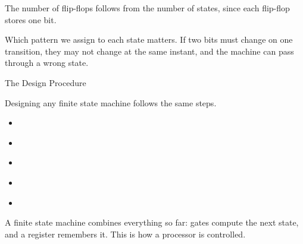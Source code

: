 \documentclass[mathserif, handout]{beamer}
\begin{document}
\begin{frame}
  The number of flip-flops follows from the number of states, since each flip-flop stores one bit.\\[4mm]
  \begin{center}
  \end{center}
  \vspace{2mm}
  \begin{center}
  \end{center}
\end{frame}

\begin{frame}
  Which pattern we assign to each state matters. If two bits must change on one transition, they may not change at the same instant, and the machine can pass through a wrong state.\\[3mm]
  \begin{center}
  \end{center}
\end{frame}

\begin{frame}{The Design Procedure}
  \begin{center}
    \Large {}
  \end{center}
\end{frame}

\begin{frame}
  Designing any finite state machine follows the same steps.\\[3mm]
  \begin{itemize}
    \item[(1)]  \\[1.5mm]
    \item[(2)]  \\[1.5mm]
    \item[(3)]  \\[1.5mm]
    \item[(4)]  \\[1.5mm]
    \item[(5)] 
  \end{itemize}
  \vspace{2mm}
  \begin{center}
  \end{center}
\end{frame}

\begin{frame}
  \begin{center}
    A finite state machine combines everything so far: gates compute the next state, and a register remembers it. This is how a processor is controlled.
  \end{center}
\end{frame}
\end{document}
